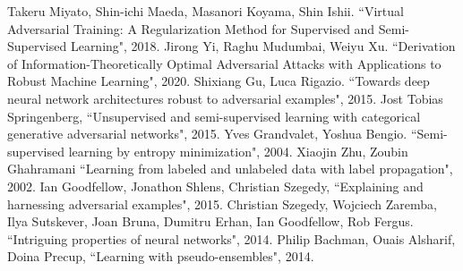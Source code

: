 \documentclass[paper=a4, fontsize=11pt]{scrartcl}
\numberwithin{equation}{section}		%
\numberwithin{figure}{section}			%
\numberwithin{table}{section}				%
\begin{document}
\begin{thebibliography}{9}

 Takeru Miyato, Shin-ichi Maeda, Masanori Koyama, Shin Ishii. ``Virtual Adversarial Training: A Regularization Method for Supervised and Semi-Supervised Learning", 2018.
     Jirong Yi, Raghu Mudumbai, Weiyu Xu. ``Derivation of Information-Theoretically Optimal Adversarial Attacks with Applications to Robust Machine Learning", 2020.
     Shixiang Gu, Luca Rigazio. ``Towards deep neural network architectures robust to adversarial examples", 2015.
     Jost Tobias Springenberg, ``Unsupervised and semi-supervised learning with categorical generative adversarial networks", 2015.
     Yves Grandvalet, Yoshua Bengio. ``Semi-supervised learning by entropy minimization", 2004.
     Xiaojin Zhu, Zoubin Ghahramani ``Learning from labeled and unlabeled data with label propagation", 2002.
     Ian Goodfellow, Jonathon Shlens, Christian Szegedy, ``Explaining and harnessing adversarial examples", 2015.
     Christian Szegedy, Wojciech Zaremba, Ilya Sutskever, Joan Bruna, Dumitru Erhan, Ian Goodfellow, Rob Fergus.  ``Intriguing properties of neural networks", 2014.
     Philip Bachman, Ouais Alsharif, Doina Precup, ``Learning with pseudo-ensembles", 2014.

\end{thebibliography}

\end{document}
